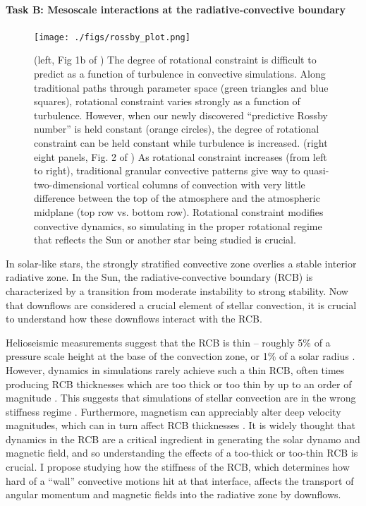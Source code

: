 \documentclass[11pt, preprint]{aastex}
\begin{document}
\paragraph{Task B: Mesoscale interactions at the radiative-convective boundary}
\label{sct:taskB}
\begin{figure}[t!]
    \texttt{[image: ./figs/rossby\_plot.png]}
    \caption{(left, Fig 1b of \citet{anders&all2019}) The degree of rotational constraint is difficult to predict as a function of turbulence in convective simulations.
	Along traditional paths through parameter space (green triangles and blue squares), rotational constraint varies strongly as a function of turbulence.
	However, when our newly discovered ``predictive Rossby number'' is held constant (orange circles), the degree of rotational constraint can be held constant while turbulence is increased.
	(right eight panels, Fig. 2 of \citet{anders&all2019}) As rotational constraint increases (from left to right), traditional granular convective patterns give way to quasi-two-dimensional vortical columns of convection with very little difference between the top of the atmosphere and the atmospheric midplane (top row vs. bottom row).
	Rotational constraint modifies convective dynamics, so simulating in the proper rotational regime that reflects the Sun or another star being studied is crucial.
	\label{fig:rossby_plot} }
\end{figure}

In solar-like stars, the strongly stratified convective zone overlies a stable interior radiative zone.
In the Sun, the radiative-convective boundary (RCB) is characterized by a transition from moderate instability to strong stability.
Now that downflows are considered a crucial element of stellar convection, it is crucial to understand how these downflows interact with the RCB.

Helioseismic measurements suggest that the RCB is thin -- roughly 5\% of a pressure scale height at the base of the convection zone, or 1\% of a solar radius \citep{basu1997}.
However, dynamics in simulations rarely achieve such a thin RCB, often times producing RCB thicknesses which are too thick or too thin by up to an order of magnitude \citep[see e.g.,][]{hotta2017, kapyla2018}.
This suggests that simulations of stellar convection are in the wrong stiffness regime \citep{brummell&all2002, couston&all2017}.
Furthermore, magnetism can appreciably alter deep velocity magnitudes, which can in turn affect RCB thicknesses \citep{hotta&all2015}.
It is widely thought that dynamics in the RCB are a critical ingredient in generating the solar dynamo and magnetic field, and so understanding the effects of a too-thick or too-thin RCB is crucial.
I propose studying how the stiffness of the RCB, which determines how hard of a ``wall'' convective motions hit at that interface, affects the transport of angular momentum and magnetic fields into the radiative zone by downflows.
\end{document}
